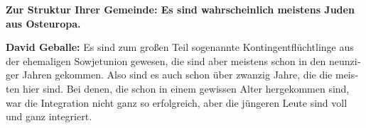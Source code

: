 \begin{otherlanguage}{ngerman}




\textbf{Zur Struktur Ihrer Gemeinde: Es sind wahrscheinlich meistens Juden aus Osteuropa.}

\textbf{David Geballe:} Es sind zum großen Teil sogenannte Kontingentflüchtlinge aus der ehemaligen Sowjetunion gewesen, die sind aber meistens schon in den neunziger Jahren gekommen. Also sind es auch schon über zwanzig Jahre, die die meisten hier sind. Bei denen, die schon in einem gewissen Alter hergekommen sind, war die Integration nicht ganz so erfolgreich, aber die jüngeren Leute sind voll und ganz integriert. 




\end{otherlanguage}
